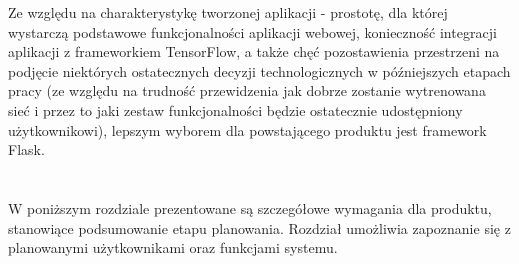 \documentclass[polish,12pt]{aghthesis}
\begin{document}
\par
Ze względu na charakterystykę tworzonej aplikacji - prostotę, dla której wystarczą podstawowe funkcjonalności aplikacji webowej, konieczność integracji aplikacji z frameworkiem TensorFlow, a także chęć pozostawienia przestrzeni na podjęcie niektórych ostatecznych decyzji technologicznych w późniejszych etapach pracy (ze względu na trudność przewidzenia jak dobrze zostanie wytrenowana sieć i przez to jaki zestaw funkcjonalności będzie ostatecznie udostępniony użytkownikowi), lepszym wyborem dla powstającego produktu jest framework Flask.

\newpage
\section{\SectionTitleScope}
\label{sec:zakres-funkcjonalnosci}
\par W poniższym rozdziale prezentowane są szczegółowe wymagania dla produktu, stanowiące podsumowanie etapu planowania. Rozdział umożliwia zapoznanie się z planowanymi użytkownikami oraz funkcjami systemu.
\end{document}
